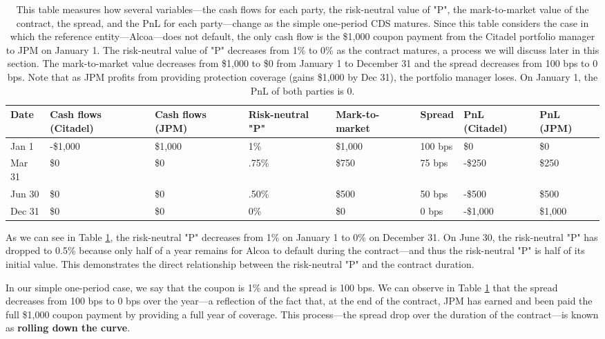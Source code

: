 \documentclass[article]{jss}
\begin{document}
\begin{table}[H]
\centering
{\footnotesize
\begin{tabular}{llllllll}
  \hline
Date & Cash flows (Citadel) & Cash flows (JPM) & Risk-neutral "P" & Mark-to-market & Spread & PnL (Citadel) & PnL (JPM) \\ 
  \hline
  Jan 1 & -\$1,000 & \$1,000 & 1\% & \$1,000 & 100 bps & \$0 & \$0 \\ 
  Mar 31 & \$0 & \$0 & .75\% & \$750 & 75 bps & -\$250 & \$250 \\ 
  Jun 30 & \$0 & \$0 & .50\% & \$500 & 50 bps & -\$500 & \$500 \\ 
  Dec 31 & \$0 & \$0 & 0\% & \$0 & 0 bps & -\$1,000 & \$1,000 \\
   \hline
\end{tabular}
}

\caption{This table measures how several variables---the cash flows for each party, the risk-neutral value of "P", the mark-to-market value of the contract, the spread, and the PnL for each party---change as the simple one-period CDS matures. Since this table considers the case in which the reference entity---Alcoa---does not default, the only cash flow is the \$1,000 coupon payment from the Citadel portfolio manager to JPM on January 1. The risk-neutral value of "P" decreases from 1\% to 0\% as the contract matures, a process we will discuss later in this section. The mark-to-market value decreases from \$1,000 to \$0 from January 1 to December 31 and the spread decreases from 100 bps to 0 bps. Note that as JPM profits from providing protection coverage (gains \$1,000 by Dec 31), the portfolio manager loses. On January 1, the PnL of both parties is 0.} 
\label{table.1}
\end{table}

As we can see in Table \ref{table.1}, the risk-neutral "P" decreases from 1\% on January 1 to 0\% on December 31. On June 30, the risk-neutral "P" has dropped to 0.5\% because only half of a year remains for Alcoa to default during the contract---and thus the risk-neutral "P" is half of its initial value. This demonstrates the direct relationship between the risk-neutral "P" and the contract duration. 

In our simple one-period case, we say that the coupon is 1\% and the spread is 100 bps. We can observe in Table \ref{table.1} that the spread decreases from 100 bps to 0 bps over the year---a reflection of the fact that, at the end of the contract, JPM has earned and been paid the full \$1,000 coupon payment by providing a full year of coverage. This process---the spread drop over the duration of the contract---is known as \textbf{rolling down the curve}. 
\end{document}
